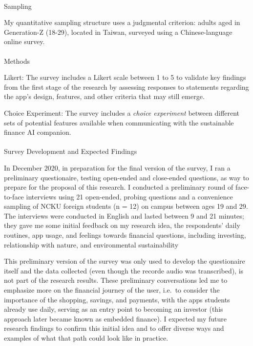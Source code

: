 \documentclass[
  12pt,
  letterpaper,
  DIV=11,
  numbers=noendperiod]{scrartcl}
\makeatletter
\let\oldparagraph\paragraph
\renewcommand{\paragraph}{
    \@ifstar
      \xxxParagraphStar
      \xxxParagraphNoStar
  }
\newcommand{\xxxParagraphStar}[1]{\oldparagraph*{#1}\mbox{}}
\newcommand{\xxxParagraphNoStar}[1]{\oldparagraph{#1}\mbox{}}
\makeatother
\begin{document}
\paragraph{Sampling}\label{sampling-1}

My quantitative sampling structure uses a judgmental criterion: adults
aged in Generation-Z (18-29), located in Taiwan, surveyed using a
Chinese-language online survey.

\paragraph{Methods}\label{methods-1}

Likert: The survey includes a Likert scale between 1 to 5 to validate
key findings from the first stage of the research by assessing responses
to statements regarding the app's design, features, and other criteria
that may still emerge.

Choice Experiment: The survey includes a \emph{choice experiment}
between different sets of potential features available when
communicating with the sustainable finance AI companion.

\paragraph{Survey Development and Expected
Findings}\label{survey-development-and-expected-findings}

In December 2020, in preparation for the final version of the survey, I
ran a preliminary questionaire, testing open-ended and close-ended
questions, as way to prepare for the proposal of this research. I
conducted a preliminary round of face-to-face interviews using 21
open-ended, probing questions and a convenience sampling of NCKU foreign
students (n = 12) on campus between ages 19 and 29. The interviews were
conducted in English and lasted between 9 and 21 minutes; they gave me
some initial feedback on my research idea, the respondents' daily
routines, app usage, and feelings towards financial questions, including
investing, relationship with nature, and environmental sustainability

This preliminary version of the survey was only used to develop the
questionaire itself and the data collected (even though the recorde
audio was transcribed), is not part of the research results. These
preliminary conversations led me to emphasize more on the financial
journey of the user, i.e.~to consider the importance of the shopping,
savings, and payments, with the apps students already use daily, serving
as an entry point to becoming an investor (this approach later became
known as embedded finance). I expected my future research findings to
confirm this initial idea and to offer diverse ways and examples of what
that path could look like in practice.
\end{document}
